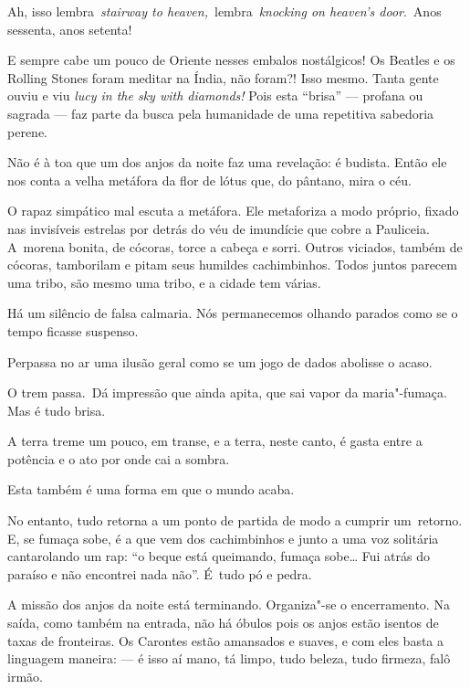 Ah, isso lembra~\emph{stairway to heaven,}~lembra~\emph{knocking on
heaven's door}.~Anos sessenta, anos setenta!

E sempre cabe um pouco de Oriente nesses embalos nostálgicos! Os Beatles
e os Rolling Stones foram meditar na Índia, não foram?! Isso mesmo.
Tanta gente ouviu e viu \emph{lucy in the sky with diamonds!} Pois esta
``brisa'' --- profana ou sagrada --- faz parte da busca pela humanidade
de uma repetitiva sabedoria perene.

Não é à toa que um dos anjos da noite faz uma revelação: é budista.
Então ele nos conta a velha metáfora da flor de lótus que, do pântano,
mira o céu.

O rapaz simpático mal escuta a metáfora. Ele metaforiza a modo próprio,
fixado nas invisíveis estrelas por detrás do véu de imundície que cobre
a Pauliceia. A~morena bonita, de cócoras, torce a cabeça e sorri. Outros
viciados, também de cócoras, tamborilam e pitam seus humildes
cachimbinhos. Todos juntos parecem uma tribo, são mesmo uma tribo, e a
cidade tem várias.

 

Há um silêncio de falsa calmaria. Nós permanecemos olhando parados como
se o tempo ficasse suspenso.

 

Perpassa no ar uma ilusão geral como se um jogo de dados abolisse o
acaso.

 

O trem passa.~Dá impressão que ainda apita, que sai vapor da
maria"-fumaça. Mas é tudo brisa.

 

A terra treme um pouco, em transe, e a terra, neste canto, é gasta entre
a potência e o ato por onde cai a sombra.

 

Esta também é uma forma em que o mundo acaba.

 

No entanto, tudo retorna a um ponto de partida de modo a cumprir
um~retorno. E, se fumaça sobe, é a que vem dos cachimbinhos e junto a
uma voz solitária cantarolando um rap: ``o beque está queimando, fumaça
sobe… Fui atrás do paraíso e não encontrei nada não''. É~tudo pó e
pedra.

 

A missão dos anjos da noite está terminando. Organiza"-se o encerramento.
Na saída, como também na entrada, não há óbulos pois os anjos estão
isentos de taxas de fronteiras. Os Carontes estão amansados e suaves, e
com eles basta a linguagem maneira: --- é isso aí mano, tá limpo, tudo
beleza, tudo firmeza, falô irmão.

